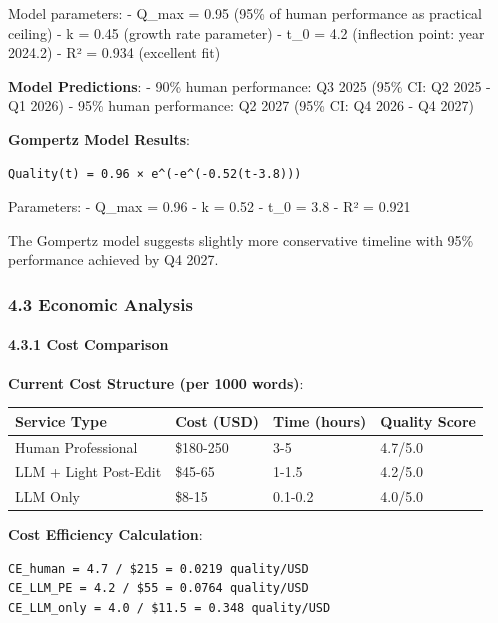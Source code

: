 \documentclass[12pt,a4paper]{article}
\begin{document}
{{{Model parameters: - Q\_max = 0.95 (95\% of human performance as
practical ceiling) - k = 0.45 (growth rate parameter) - t\_0 = 4.2
(inflection point: year 2024.2) - R² = 0.934 (excellent fit)

\textbf{Model Predictions}: - 90\% human performance: Q3 2025 (95\% CI:
Q2 2025 - Q1 2026) - 95\% human performance: Q2 2027 (95\% CI: Q4 2026 -
Q4 2027)

\textbf{Gompertz Model Results}:

\begin{verbatim}
Quality(t) = 0.96 × e^(-e^(-0.52(t-3.8)))
\end{verbatim}

Parameters: - Q\_max = 0.96 - k = 0.52 - t\_0 = 3.8 - R² = 0.921

The Gompertz model suggests slightly more conservative timeline with
95\% performance achieved by Q4 2027.

\hypertarget{economic-analysis}{%
\subsubsection{4.3 Economic Analysis}\label{economic-analysis}}

\hypertarget{cost-comparison}{%
\paragraph{4.3.1 Cost Comparison}\label{cost-comparison}}

\textbf{Current Cost Structure (per 1000 words)}:

\begin{longtable}[]{@{}llll@{}}
\toprule\noalign{}
Service Type & Cost (USD) & Time (hours) & Quality Score \\
\midrule\noalign{}
\endhead
\bottomrule\noalign{}
\endlastfoot
Human Professional & \$180-250 & 3-5 & 4.7/5.0 \\
LLM + Light Post-Edit & \$45-65 & 1-1.5 & 4.2/5.0 \\
LLM Only & \$8-15 & 0.1-0.2 & 4.0/5.0 \\
\end{longtable}

\textbf{Cost Efficiency Calculation}:

\begin{verbatim}
CE_human = 4.7 / $215 = 0.0219 quality/USD
CE_LLM_PE = 4.2 / $55 = 0.0764 quality/USD
CE_LLM_only = 4.0 / $11.5 = 0.348 quality/USD
\end{verbatim}

}}}
\end{document}
